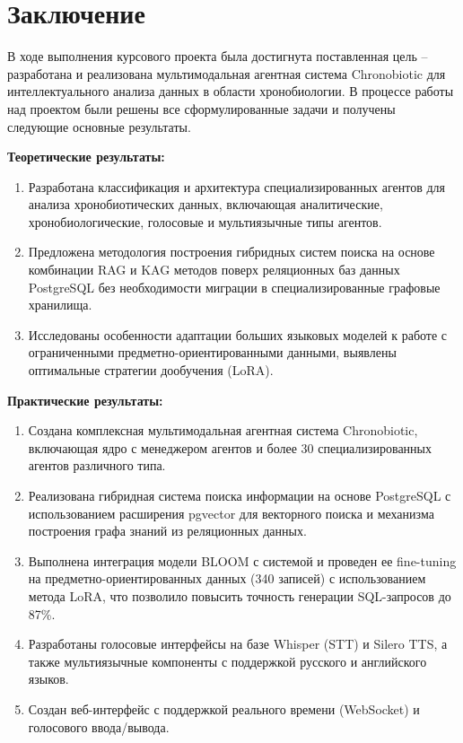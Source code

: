 \documentclass[a4paper,14pt]{extarticle}
\begin{document}
	\section*{Заключение}
	
	В ходе выполнения курсового проекта была достигнута поставленная цель – разработана и реализована мультимодальная агентная система Chronobiotic для интеллектуального анализа данных в области хронобиологии. В процессе работы над проектом были решены все сформулированные задачи и получены следующие основные результаты.
	
	\textbf{Теоретические результаты:}
	\begin{enumerate}
		\item Разработана классификация и архитектура специализированных агентов для анализа хронобиотических данных, включающая аналитические, хронобиологические, голосовые и мультиязычные типы агентов.
		\item Предложена методология построения гибридных систем поиска на основе комбинации RAG и KAG методов поверх реляционных баз данных PostgreSQL без необходимости миграции в специализированные графовые хранилища.
		\item Исследованы особенности адаптации больших языковых моделей к работе с ограниченными предметно-ориентированными данными, выявлены оптимальные стратегии дообучения (LoRA).
	\end{enumerate}
	
	\textbf{Практические результаты:}
	\begin{enumerate}
		\item Создана комплексная мультимодальная агентная система Chronobiotic, включающая ядро с менеджером агентов и более 30 специализированных агентов различного типа.
		\item Реализована гибридная система поиска информации на основе PostgreSQL с использованием расширения pgvector для векторного поиска и механизма построения графа знаний из реляционных данных.
		\item Выполнена интеграция модели BLOOM с системой и проведен ее fine-tuning на предметно-ориентированных данных (340 записей) с использованием метода LoRA, что позволило повысить точность генерации SQL-запросов до 87\%.
		\item Разработаны голосовые интерфейсы на базе Whisper (STT) и Silero TTS, а также мультиязычные компоненты с поддержкой русского и английского языков.
		\item Создан веб-интерфейс с поддержкой реального времени (WebSocket) и голосового ввода/вывода.
	\end{enumerate}
	
\end{document}
